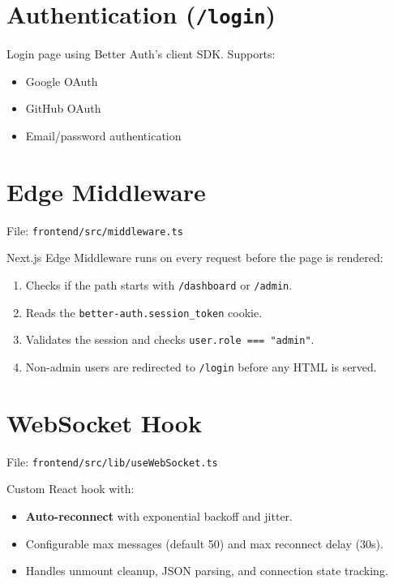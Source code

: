 \documentclass[12pt, a4paper]{report}
\begin{document}
\section{Authentication (\texttt{/login})}

Login page using Better Auth's client SDK. Supports:
\begin{itemize}
    \item Google OAuth
    \item GitHub OAuth
    \item Email/password authentication
\end{itemize}

\section{Edge Middleware}

File: \texttt{frontend/src/middleware.ts}

Next.js Edge Middleware runs on every request before the page is rendered:
\begin{enumerate}
    \item Checks if the path starts with \texttt{/dashboard} or \texttt{/admin}.
    \item Reads the \texttt{better-auth.session\_token} cookie.
    \item Validates the session and checks \texttt{user.role === "admin"}.
    \item Non-admin users are redirected to \texttt{/login} before any HTML is served.
\end{enumerate}

\section{WebSocket Hook}

File: \texttt{frontend/src/lib/useWebSocket.ts}

Custom React hook with:
\begin{itemize}
    \item \textbf{Auto-reconnect} with exponential backoff and jitter.
    \item Configurable max messages (default 50) and max reconnect delay (30s).
    \item Handles unmount cleanup, JSON parsing, and connection state tracking.
\end{itemize}


\end{document}

